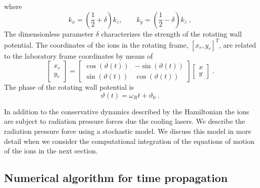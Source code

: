 \documentclass[aps, pra, preprint]{revtex4-1}
\begin{document}
where
\begin{equation}
k_x=\left(\frac{1}{2}+\delta\right)k_z,\qquad 
k_y=\left(\frac{1}{2}-\delta\right)k_z\;,
\end{equation}
The dimensionless parameter $\delta$ characterizes the strength
of the rotating wall potential. The coordinates of the ions in
the rotating frame, $[x_r, y_r]^T$, are related to the laboratory
frame coordinates by means of
\begin{equation}
\left[
\begin{array}{c}
x_r\\
y_r
\end{array}\right] =
\left[
\begin{array}{cc}
\cos(\vartheta(t)) & -\sin(\vartheta(t))\\
\sin(\vartheta(t)) & \cos(\vartheta(t))
\end{array}\right]
\left[\begin{array}{c}
x\\
y
\end{array}\right]\;.
\end{equation}
The phase of the rotating wall potential is
\begin{equation}
\vartheta(t)=\omega_R t+\vartheta_0\;.
\end{equation}

In addition to the conservative dynamics described by the
Hamiltonian the ions are subject to radiation pressure forces due
the cooling lasers. We describe the radiation pressure force
using a stochastic model. We discuss this model in more detail
when we consider the computational integration of the equations
of motion of the ions in the next section.


\subsection{Numerical algorithm for time propagation}
\end{document}
